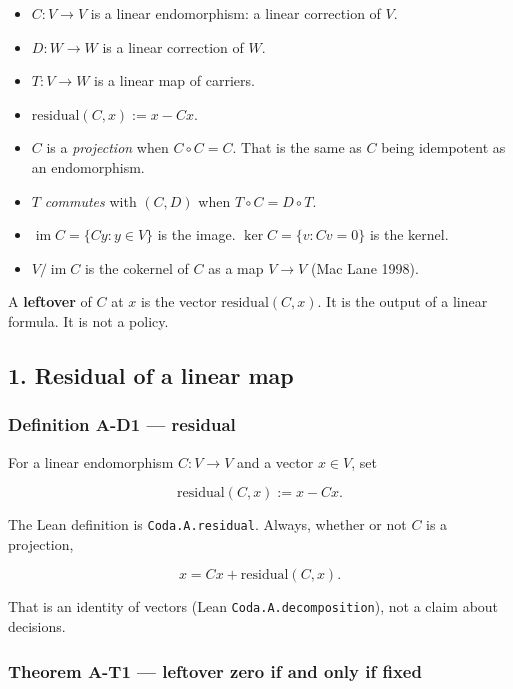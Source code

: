 \documentclass[
  11pt,
]{article}
\providecommand{\tightlist}{%
  \setlength{\itemsep}{0pt}\setlength{\parskip}{0pt}}
\begin{document}
\begin{itemize}
\tightlist
\item
  \(C:V\to V\) is a linear endomorphism: a linear correction of \(V\).
\item
  \(D:W\to W\) is a linear correction of \(W\).
\item
  \(T:V\to W\) is a linear map of carriers.
\item
  \(\mathrm{residual}(C,x):=x-Cx\).
\item
  \(C\) is a \emph{projection} when \(C\circ C=C\). That is the same as \(C\) being idempotent as an endomorphism.
\item
  \(T\) \emph{commutes} with \((C,D)\) when \(T\circ C=D\circ T\).
\item
  \(\operatorname{im} C=\{Cy:y\in V\}\) is the image. \(\ker C=\{v:Cv=0\}\) is the kernel.
\item
  \(V/\operatorname{im} C\) is the cokernel of \(C\) as a map \(V\to V\) (Mac Lane 1998).
\end{itemize}

A \textbf{leftover} of \(C\) at \(x\) is the vector \(\mathrm{residual}(C,x)\). It is the output of a linear formula. It is not a policy.

\subsection{1. Residual of a linear map}\label{residual-of-a-linear-map}

\subsubsection{Definition A-D1 --- residual}\label{definition-a-d1-residual}

For a linear endomorphism \(C:V\to V\) and a vector \(x\in V\), set

\[
\mathrm{residual}(C,x)
:=
x-Cx.
\]

The Lean definition is \texttt{Coda.A.residual}. Always, whether or not \(C\) is a projection,

\[
x
=
Cx
+
\mathrm{residual}(C,x).
\]

That is an identity of vectors (Lean \nolinkurl{Coda.A.decomposition}), not a claim about decisions.

\subsubsection{Theorem A-T1 --- leftover zero if and only if fixed}\label{theorem-a-t1-leftover-zero-if-and-only-if-fixed}
\end{document}
